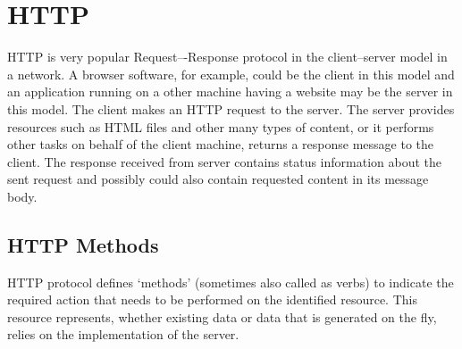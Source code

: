 \section{HTTP}


\hspace*{0.2in}HTTP is very popular Request–-Response protocol in the client–server model in a network. A browser software, for example, could be the client in this model and an application running on a other machine having a website may be the server in this model. The client makes an HTTP request to the server. The server  provides resources such as HTML files and other many types of content, or it performs other tasks on behalf of the client machine, returns a response message to the client. The response received from server contains status information about the sent request and possibly could also contain requested content in its message body.

\subsection{HTTP Methods}

HTTP protocol defines `methods' (sometimes also called as verbs) to indicate the required action that needs to be performed on the identified resource. This resource represents, whether existing data or data that is generated on the fly, relies on the implementation of the server. 

